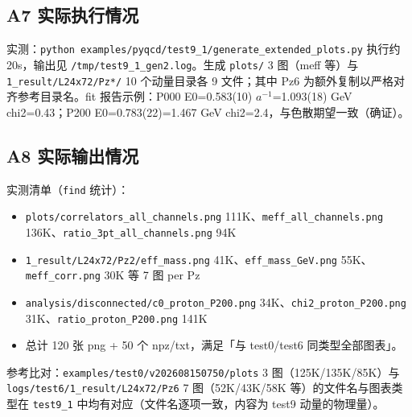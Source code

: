 \documentclass[UTF8]{ctexart}
\begin{document}
\subsection{A7 实际执行情况}
实测：\texttt{python examples/pyqcd/test9\_1/generate\_extended\_plots.py} 执行约 20s，输出见 \texttt{/tmp/test9\_1\_gen2.log}。生成 \texttt{plots/} 3 图（meff 等）与 \texttt{\nolinkurl{1\_result/L24x72/Pz*/}} 10 个动量目录各 9 文件；其中 Pz6 为额外复制以严格对齐参考目录名。fit 报告示例：P000 E0=0.583(10) $a^{-1}$=1.093(18) GeV chi2=0.43；P200 E0=0.783(22)=1.467 GeV chi2=2.4，与色散期望一致（确证）。

\subsection{A8 实际输出情况}
实测清单（\texttt{find} 统计）：
\begin{itemize}
\item \texttt{plots/correlators\_all\_channels.png} 111K、\texttt{\nolinkurl{meff\_all\_channels.png}} 136K、\texttt{\nolinkurl{ratio\_3pt\_all\_channels.png}} 94K
\item \texttt{1\_result/L24x72/Pz2/eff\_mass.png} 41K、\texttt{eff\_mass\_GeV.png} 55K、\texttt{meff\_corr.png} 30K 等 7 图 per Pz
\item \texttt{analysis/disconnected/c0\_proton\_P200.png} 34K、\texttt{chi2\_proton\_P200.png} 31K、\texttt{ratio\_proton\_P200.png} 141K
\item 总计 120 张 png + 50 个 npz/txt，满足「与 test0/test6 同类型全部图表」。
\end{itemize}
参考比对：\texttt{examples/test0/v202608150750/plots} 3 图（125K/135K/85K）与 \texttt{\nolinkurl{logs/test6/1\_result/L24x72/Pz6}} 7 图（52K/43K/58K 等）的文件名与图表类型在 \texttt{test9\_1} 中均有对应（文件名逐项一致，内容为 test9 动量的物理量）。
\end{document}
